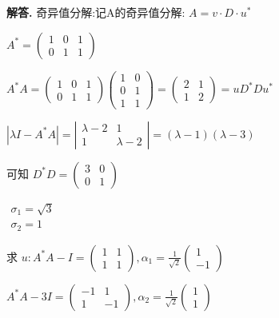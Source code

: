 \documentclass[12pt, a4paper, oneside]{ctexart}
\newenvironment{solution}{\par\noindent\textbf{解答. }}{\par}
\begin{document}
\begin{solution}
    奇异值分解:记A的奇异值分解:
       $ A=v \cdot D \cdot u^{*}$    
    
        $A^{*}=\left(\begin{array}{lll}1 & 0 & 1 \\0 & 1 & 1\end{array}\right)$
    
        $A^{*} A=\left(\begin{array}{lll}1 & 0 & 1 \\0 & 1 & 1\end{array}\right)\left(\begin{array}{ll}1 & 0 \\0 & 1 \\1 & 1\end{array}\right)=\left(\begin{array}{ll}2 & 1 \\1 & 2\end{array}\right)=u D^{*} D  u^{*} $
    
        $\left|\lambda I-A^{*} A\right|=\left|\begin{array}{cc}\lambda-2 & 1 \\1 & \lambda-2\end{array}\right|=(\lambda-1)(\lambda-3)$ 
    
        可知  $D^{*} D=\left(\begin{array}{ll}3 & 0 \\0 & 1\end{array}\right)$

        $\begin{array}{l}\sigma_{1}=\sqrt{3} \\\sigma_{2}=1\end{array}$
    
        求  $u:A^{*} A-I=\left(\begin{array}{cc}1 & 1 \\1 & 1\end{array}\right), \alpha_{1}=\frac{1}{\sqrt{2}}\left(\begin{array}{l}1 \\-1\end{array}\right)$ 
    
        $A^{*} A-3I=\left(\begin{array}{cc}-1 & 1 \\1 & -1\end{array}\right), \alpha_{2}=\frac{1}{\sqrt{2}}\left(\begin{array}{l}1 \\1\end{array}\right)$
    

\end{solution}
\end{document}
